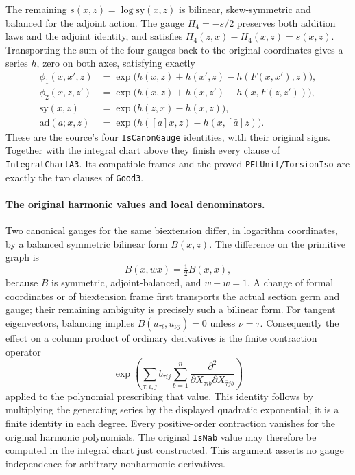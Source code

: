 The remaining $s(x,z)=\log\mathrm{sy}(x,z)$ is bilinear,
skew-symmetric and balanced for the adjoint action.  The gauge
$H_4=-s/2$ preserves both addition laws and the adjoint identity,
and satisfies $H_4(z,x)-H_4(x,z)=s(x,z)$.
Transporting the sum of the four gauges back to the original
coordinates gives a series $h$, zero on both axes, satisfying
exactly
\begin{align*}
 \phi_1(x,x',z)&=
   \exp\bigl(h(x,z)+h(x',z)-h(F(x,x'),z)\bigr),\\
 \phi_2(x,z,z')&=
   \exp\bigl(h(x,z)+h(x,z')-h(x,F(z,z'))\bigr),\\
 \mathrm{sy}(x,z)&=\exp\bigl(h(z,x)-h(x,z)\bigr),\\
 \mathrm{ad}(a;x,z)&=
   \exp\bigl(h([a]x,z)-h(x,[\bar a]z)\bigr).
\end{align*}
These are the source's four \texttt{IsCanonGauge} identities, with
their original signs\cite{good3-source}.  Together with the integral
chart above they finish every clause of \texttt{IntegralChartA3}.
Its compatible frames and the proved \texttt{PELUnif/TorsionIso}
are exactly the two clauses of \texttt{Good3}.

\paragraph{The original harmonic values and local denominators.}
Two canonical gauges for the same biextension differ, in logarithm
coordinates, by a balanced symmetric bilinear form $B(x,z)$.
The difference on the primitive graph is
\[
 B(x,wx)=\tfrac12 B(x,x),
\]
because $B$ is symmetric, adjoint-balanced, and $w+\bar w=1$.
A change of formal coordinates or of biextension frame first
transports the actual section germ and gauge; their remaining
ambiguity is precisely such a bilinear form.
For tangent eigenvectors, balancing implies
$B(u_{\tau i},u_{\nu j})=0$ unless $\nu=\bar\tau$.
Consequently the effect on a column product of ordinary derivatives
is the finite contraction operator
\[
 \exp\!\left(\sum_{\tau,i,j} b_{\tau ij}
       \sum_{b=1}^{n}
       \frac{\partial^2}
        {\partial X_{\tau i b}\partial X_{\bar\tau j b}}\right)
\]
applied to the polynomial prescribing that value.  This identity
follows by multiplying the generating series by the displayed
quadratic exponential; it is a finite identity in each degree.
Every positive-order contraction vanishes for the original harmonic
polynomials.  The original \texttt{IsNab} value may therefore be
computed in the integral chart just constructed.  This argument
asserts no gauge independence for arbitrary nonharmonic derivatives.

